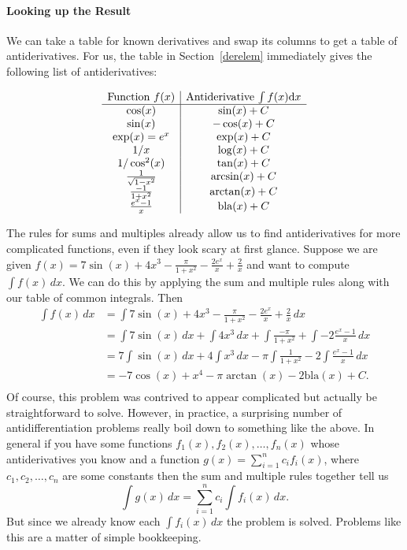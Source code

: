 \paragraph{Looking up the Result}

We can take a table for known derivatives and swap its columns to get a
table of antiderivatives.
For us, the table in Section~\ref{derelem} immediately gives the following
list of antiderivatives:

\[
\begin{array}{c|c}
\mbox{Function $f(x)$}&\mbox{Antiderivative $\int f(x){\mbox{d}}x$}\\
\hline
\cos(x)&\sin(x)+C\\
\sin(x)&-\cos(x)+C\\
\exp(x)=e^x&\exp(x)+C\\
1/x&\log(x)+C\\
1/\cos^2(x)&\tan(x)+C\\
\frac{1}{\sqrt{1-x^2}}&
\arcsin(x)+C\\
\frac{-1}{1+x^2}&
\arctan(x)+C\\
\frac{e^x-1}{x}&
\mbox{bla}(x)+C\\
\end{array}
\]

\begin{bsp}
The rules for sums  and multiples already allow us to find antiderivatives
for more complicated functions, even if they look scary at first glance.
Suppose we are given $f(x) = 7\sin(x) + 4x^3 - \frac{\pi}{1+x^2} - \frac{2e^x}{x}+\frac{2}{x}$ and want to compute $\int f(x) \, dx$. We can do this by applying the sum and multiple rules along with our table of common integrals. Then
\begin{equation*}
\begin{split}
\int f(x) \, dx &=  \int 7\sin(x) + 4x^3 - \frac{\pi}{1+x^2} - \frac{2e^x}{x}+\frac{2}{x} \, dx\\
&= \int 7\sin(x) \, dx + \int 4x^3 \, dx + \int \frac{-\pi}{1+x^2} + \int -2\frac{e^x-1}{x} \, dx\\
&=  7\int \sin(x) \, dx + 4\int x^3 \, dx - \pi\int \frac{1}{1+x^2} - 2\int \frac{e^x-1}{x} \, dx \\
&= -7\cos(x) + x^4 -\pi\arctan(x) - 2\text{bla}(x) + C. \\
\end{split}
\end{equation*}
Of course, this problem was contrived to appear complicated but actually be straightforward to solve. However, in practice, a surprising number of antidifferentiation problems really boil down to something like the above. In general if you have some functions $f_1(x),f_2(x), \dots, f_n(x)$ whose antiderivatives you know and a function $g(x) = \sum_{i=1}^{n}c_if_i(x)$, where $c_1,c_2,\dots,c_n$ are some constants then the sum and multiple rules together tell us
\[\int g(x) \, dx = \sum_{i=1}^{n}c_i\int f_i(x) \, dx.\]
But since we already know each $\int f_i(x) \, dx$ the problem is solved. Problems like this are a matter of simple bookkeeping.
\end{bsp}

